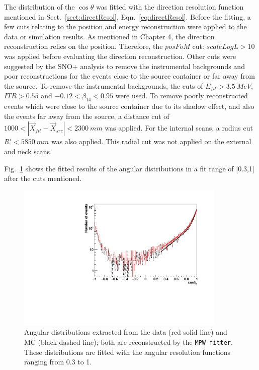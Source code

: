 The distribution of the $\cos\theta$ was fitted with the direction resolution function mentioned in Sect.~\ref{sect:directResol}, Eqn.~\ref{eq:directResol}. Before the fitting, a few cuts relating to the position and energy reconstruction were applied to the data or simulation results. As mentioned in Chapter 4, the direction reconstruction relies on the position. Therefore, the $posFoM$ cut: $scaleLogL>10$ was applied before evaluating the direction reconstruction. Other cuts were suggested by the SNO+ analysis to remove the instrumental backgrounds and poor reconstructions for the events close to the source container or far away from the source. To remove the instrumental backgrounds, the cuts of $E_{fit}>3.5~MeV$, $ITR>0.55$ and $-0.12<\beta_{14}<0.95$ were used. To remove poorly reconstructed events which were close to the source container due to its shadow effect, and also the events far away from the source, a distance cut of $1000<|\vec{X}_{fit}-\vec{X}_{src}|<2300~mm$ was applied. For the internal scans, a radius cut $R'<5850~mm$ was also applied. This radial cut was not applied on the external and neck scans\cite{waterunidoc}.

Fig.~\ref{angularResolMPW} shows the fitted results of the angular distributions in a fit range of [0.3,1] after the cuts mentioned. 
\begin{figure}
	\centering
	\includegraphics[width=10cm]{16NangularResol.pdf}
	\caption[Angular distributions extracted from the data and MC.]{Angular distributions extracted from the data (red solid line) and MC (black dashed line); both are reconstructed by the \texttt{MPW fitter}. These distributions are fitted with the angular resolution functions ranging from 0.3 to 1.}
	\label{angularResolMPW}
\end{figure}

